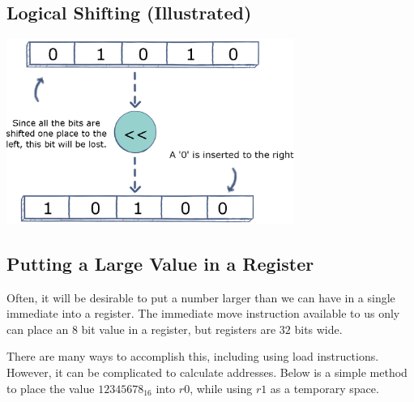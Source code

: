 \documentclass[12pt]{article}
\newcommand{\reg}[1]{$r#1$}
\begin{document}
\newpage
\subsection{Logical Shifting (Illustrated)}

\begin{center}
\includegraphics[width=3.7in]{leftshift.eps}
\end{center}

\subsection{Putting a Large Value in a Register}

Often, it will be desirable to put a number larger than we can have in a single immediate into a register.  The immediate move instruction available to us only can place an $8$ bit value in a register, but registers are $32$ bits wide.

There are many ways to accomplish this, including using load instructions.  However, it can be complicated to calculate addresses.  Below is a simple method to place the value $12345678_{16}$ into \reg{0}, while using \reg{1} as a temporary space.
\end{document}
